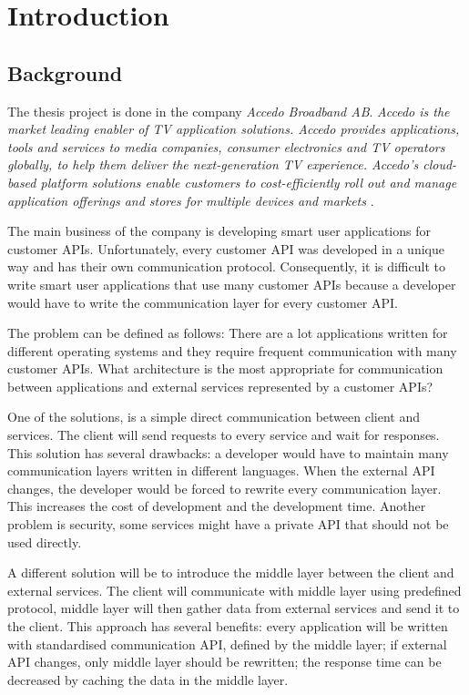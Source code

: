 \section{Introduction}

\subsection{Background}

The thesis project is done in the company \textit{Accedo Broadband AB}. \textit{Accedo is the market leading enabler of TV application solutions. Accedo provides applications, tools and services to media companies, consumer electronics and TV operators globally, to help them deliver the next-generation TV experience. Accedo’s cloud-based platform solutions enable customers to cost-efficiently roll out and manage application offerings and stores for multiple devices and markets} \cite{Accedo}.

The main business of the company is developing smart user applications for customer APIs. Unfortunately, every customer API was developed in a unique way and has their own communication protocol. Consequently, it is difficult to write smart user applications that use many customer APIs because a developer would have to write the communication layer for every customer API. 

The problem can be defined as follows:  There are a lot applications written for different operating systems and they require frequent communication with many customer APIs. What architecture is the most appropriate for communication between applications and external services represented by a customer APIs? 

One of the solutions, is a simple direct communication between client and services. The client will send requests to every service and wait for responses. This solution has several drawbacks: a developer would have to maintain many communication layers written in different languages. When the external API changes, the developer would be forced to rewrite every communication layer. This increases the cost of development and the development time. Another problem is security, some services might have a private API that should not be used directly.

A different solution will be to introduce the middle layer between the client and external services. The client will communicate with middle layer using predefined protocol, middle layer will then gather data from external services and send it to the client. This approach has several benefits: every application will be written with standardised communication API, defined by the middle layer; if external API changes, only middle layer should be rewritten; the response time can be decreased by caching the data in the middle layer. 

